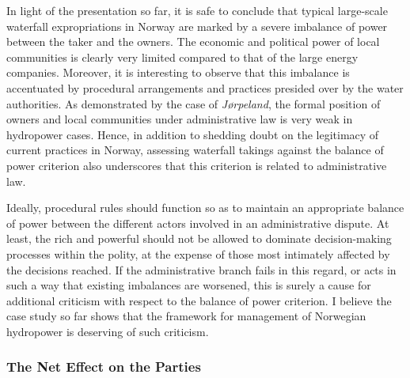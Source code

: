 
In light of the presentation so far, it is safe to conclude that typical large-scale waterfall expropriations in Norway are marked by a severe imbalance of power between the taker and the owners. The economic and political power of local communities is clearly very limited compared to that of the large energy companies. Moreover, it is interesting to observe that this imbalance is accentuated by procedural arrangements and practices presided over by the water authorities. As demonstrated by the case of {\it Jørpeland}, the formal position of owners and local communities under administrative law is very weak in hydropower cases. Hence, in addition to shedding doubt on the legitimacy of current practices in Norway, assessing waterfall takings against the balance of power criterion also underscores that this criterion is related to administrative law.

Ideally, procedural rules should function so as to maintain an appropriate balance of power between the different actors involved in an administrative dispute. At least, the rich and powerful should not be allowed to dominate decision-making processes within the polity, at the expense of those most intimately affected by the decisions reached. If the administrative branch fails in this regard, or acts in such a way that existing imbalances are worsened, this is surely a cause for additional criticism with respect to the balance of power criterion. I believe the case study so far shows that the framework for management of Norwegian hydropower is deserving of such criticism.

\subsubsection{The Net Effect on the Parties}


